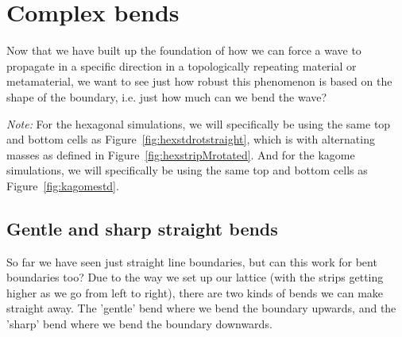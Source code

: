 \chapter{Complex bends}
\label{complexbends}
Now that we have built up the foundation of how we can force a wave to
propagate in a specific direction in a topologically repeating material or
metamaterial, we want to see just how robust this phenomenon is based on the
shape of the boundary, i.e. just how much can we bend the wave?

\textit{Note:} For the hexagonal simulations, we will specifically be using the
same top and bottom cells as Figure~\ref{fig:hexstdrotstraight}, which is with
alternating masses as defined in Figure~\ref{fig:hexstripMrotated}. And for the
kagome simulations, we will specifically be using the same top and bottom cells
as Figure~\ref{fig:kagomestd}.

\section{Gentle and sharp straight bends}
So far we have seen just straight line boundaries, but can this work for bent
boundaries too? Due to the way we set up our lattice (with the strips getting
higher as we go from left to right), there are two kinds of bends we can make
straight away. The 'gentle' bend where we bend the boundary upwards, and the
'sharp' bend where we bend the boundary downwards.

